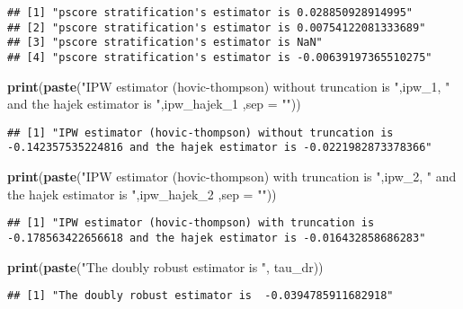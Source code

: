 \documentclass[]{article}
\newenvironment{Shaded}{\begin{snugshade}}{\end{snugshade}}
\newcommand{\KeywordTok}[1]{\textcolor[rgb]{0.13,0.29,0.53}{\textbf{#1}}}
\newcommand{\DataTypeTok}[1]{\textcolor[rgb]{0.13,0.29,0.53}{#1}}
\newcommand{\DecValTok}[1]{\textcolor[rgb]{0.00,0.00,0.81}{#1}}
\newcommand{\StringTok}[1]{\textcolor[rgb]{0.31,0.60,0.02}{#1}}
\newcommand{\NormalTok}[1]{#1}
\begin{document}
\begin{verbatim}
## [1] "pscore stratification's estimator is 0.028850928914995"   
## [2] "pscore stratification's estimator is 0.00754122081333689" 
## [3] "pscore stratification's estimator is NaN"                 
## [4] "pscore stratification's estimator is -0.00639197365510275"
\end{verbatim}

\begin{Shaded}
\begin{Highlighting}[]
\KeywordTok{print}\NormalTok{(}\KeywordTok{paste}\NormalTok{(}\StringTok{"IPW estimator (hovic-thompson) without truncation is "}\NormalTok{,ipw_}\DecValTok{1}\NormalTok{, }\StringTok{" and the hajek estimator is "}\NormalTok{,ipw_hajek_}\DecValTok{1}\NormalTok{ ,}\DataTypeTok{sep =} \StringTok{""}\NormalTok{))}
\end{Highlighting}
\end{Shaded}

\begin{verbatim}
## [1] "IPW estimator (hovic-thompson) without truncation is -0.142357535224816 and the hajek estimator is -0.0221982873378366"
\end{verbatim}

\begin{Shaded}
\begin{Highlighting}[]
\KeywordTok{print}\NormalTok{(}\KeywordTok{paste}\NormalTok{(}\StringTok{"IPW estimator (hovic-thompson) with truncation is "}\NormalTok{,ipw_}\DecValTok{2}\NormalTok{, }\StringTok{" and the hajek estimator is "}\NormalTok{,ipw_hajek_}\DecValTok{2}\NormalTok{ ,}\DataTypeTok{sep =} \StringTok{""}\NormalTok{))}
\end{Highlighting}
\end{Shaded}

\begin{verbatim}
## [1] "IPW estimator (hovic-thompson) with truncation is -0.178563422656618 and the hajek estimator is -0.016432858686283"
\end{verbatim}

\begin{Shaded}
\begin{Highlighting}[]
\KeywordTok{print}\NormalTok{(}\KeywordTok{paste}\NormalTok{(}\StringTok{"The doubly robust estimator is "}\NormalTok{, tau_dr))}
\end{Highlighting}
\end{Shaded}

\begin{verbatim}
## [1] "The doubly robust estimator is  -0.0394785911682918"
\end{verbatim}
\end{document}
